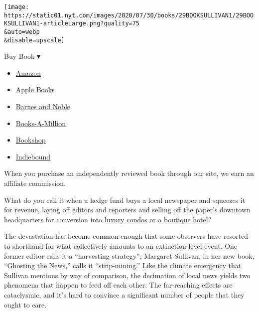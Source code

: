 \texttt{[image: https://static01.nyt.com/images/2020/07/30/books/29BOOKSULLIVAN1/29BOOKSULLIVAN1-articleLarge.png?quality=75\\\&auto=webp\\\&disable=upscale]}

Buy Book ▾

\begin{itemize}
\tightlist
\item
  \href{https://www.amazon.com/gp/search?index=books\&tag=NYTBSREV-20\&field-keywords=Ghosting+the+News+Margaret+Sullivan}{Amazon}
\item
  \href{https://du-gae-books-dot-nyt-du-prd.appspot.com/buy?title=Ghosting+the+News\&author=Margaret+Sullivan}{Apple
  Books}
\item
  \href{https://www.anrdoezrs.net/click-7990613-11819508?url=https\%3A\%2F\%2Fwww.barnesandnoble.com\%2Fw\%2F\%3Fean\%3D9781733623780}{Barnes
  and Noble}
\item
  \href{https://www.anrdoezrs.net/click-7990613-35140?url=https\%3A\%2F\%2Fwww.booksamillion.com\%2Fp\%2FGhosting\%2Bthe\%2BNews\%2FMargaret\%2BSullivan\%2F9781733623780}{Books-A-Million}
\item
  \href{https://bookshop.org/a/3546/9781733623780}{Bookshop}
\item
  \href{https://www.indiebound.org/book/9781733623780?aff=NYT}{Indiebound}
\end{itemize}

When you purchase an independently reviewed book through our site, we
earn an affiliate commission.

What do you call it when a hedge fund buys a local newspaper and
squeezes it for revenue, laying off editors and reporters and selling
off the paper's downtown headquarters for conversion into
\href{https://www.nytimes.com/2020/02/11/business/newspaper-building-redevelopment.html}{luxury
condos} or
\href{https://www.nytimes.com/2020/07/10/us/alden-global-capital-pottstown-mercury.html}{a
boutique hotel}?

The devastation has become common enough that some observers have
resorted to shorthand for what collectively amounts to an
extinction-level event. One former editor calls it a ``harvesting
strategy''; Margaret Sullivan, in her new book, ``Ghosting the News,''
calls it ``strip-mining.'' Like the climate emergency that Sullivan
mentions by way of comparison, the decimation of local news yields two
phenomena that happen to feed off each other: The far-reaching effects
are cataclysmic, and it's hard to convince a significant number of
people that they ought to care.

